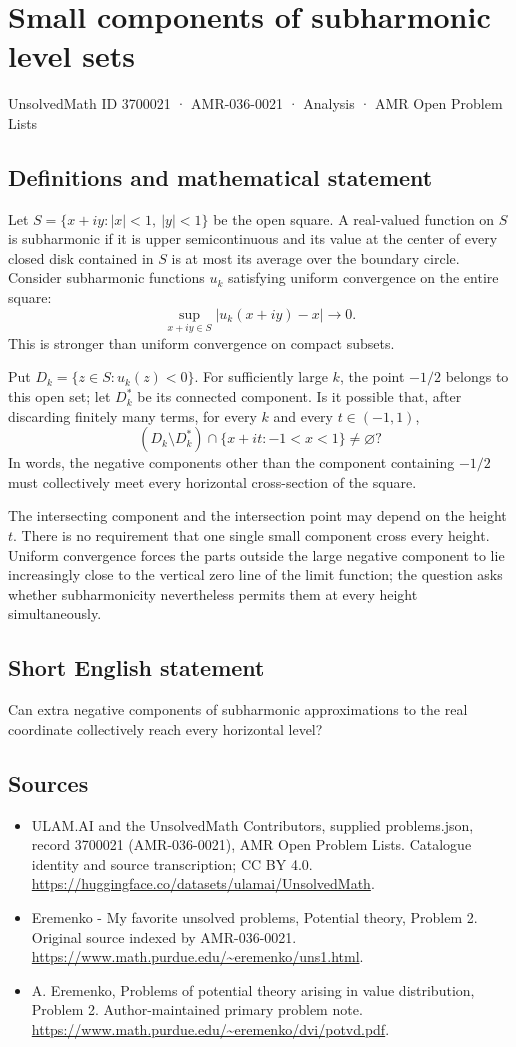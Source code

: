\documentclass[11pt,a4paper]{article}
\begin{document}
\section*{Small components of subharmonic level sets}\label{3700021}
{\small UnsolvedMath ID 3700021 · AMR-036-0021 · Analysis · AMR Open Problem Lists}
\subsection{Definitions and mathematical statement}
Let $S=\{x+iy:|x|<1,\ |y|<1\}$ be the open square.
A real-valued function on $S$ is subharmonic if it is upper
semicontinuous and its value at the center of every closed
disk contained in $S$ is at most its average over the
boundary circle.
Consider subharmonic functions $u_k$ satisfying uniform
convergence on the entire square:
\[
             \sup_{x+iy\in S}|u_k(x+iy)-x|\longrightarrow0.
\]
This is stronger than uniform convergence on compact subsets.

Put $D_k=\{z\in S:u_k(z)<0\}$. For sufficiently large
$k$, the point $-1/2$ belongs to this open set; let
$D_k^*$ be its connected component. Is it possible that,
after discarding finitely many terms, for every $k$ and
every $t\in(-1,1)$,
\[
       (D_k\setminus D_k^*)\cap
             \{x+it:-1<x<1\}\ne\varnothing?
\]
In words, the negative components other than the component
containing $-1/2$ must collectively meet every horizontal
cross-section of the square.

The intersecting component and the intersection point may
depend on the height $t$. There is no requirement that one
single small component cross every height. Uniform convergence
forces the parts outside the large negative component to
lie increasingly close to the vertical zero line of the
limit function; the question asks whether subharmonicity
nevertheless permits them at every height simultaneously.
\subsection{Short English statement}
Can extra negative components of subharmonic approximations to the real coordinate collectively reach every horizontal level?
\subsection{Sources}
\begin{itemize}
\item[S1] ULAM.AI and the UnsolvedMath Contributors, supplied problems.json, record 3700021 (AMR-036-0021), AMR Open Problem Lists. Catalogue identity and source transcription; CC BY 4.0.
\url{https://huggingface.co/datasets/ulamai/UnsolvedMath}.
\item[S2] Eremenko - My favorite unsolved problems, Potential theory, Problem 2. Original source indexed by AMR-036-0021.
\url{https://www.math.purdue.edu/~eremenko/uns1.html}.
\item[S3] A. Eremenko, Problems of potential theory arising in value distribution, Problem 2. Author-maintained primary problem note.
\url{https://www.math.purdue.edu/~eremenko/dvi/potvd.pdf}.
\end{itemize}
\end{document}
